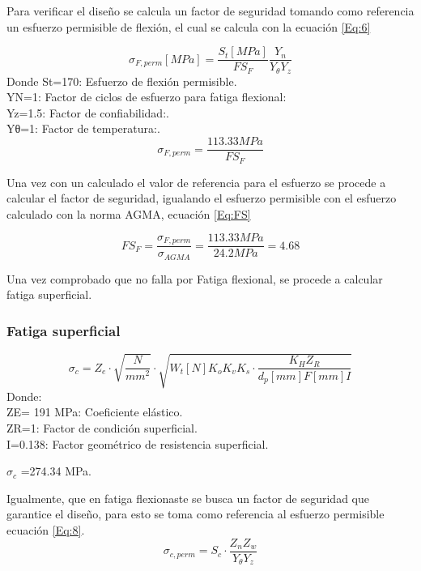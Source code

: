 Para verificar el diseño se calcula un factor de seguridad tomando como referencia un esfuerzo permisible de flexión, el cual se calcula con la ecuación \ref{Eq:6}

\begin{equation}
 \sigma_{F,perm}[MPa]=\frac{S_{t}[MPa]}{FS_{F}}  \frac{Y_{n}}{Y_{\theta}Y_{z}} 
\label{Eq:6}    
\end{equation}
Donde 
St=170: Esfuerzo de flexión permisible.\\
YN=1: Factor de ciclos de esfuerzo para fatiga flexional: \\
Yz=1.5: Factor de confiabilidad:.\\
Yθ=1: Factor de temperatura:.\\

\begin{equation}
 \sigma_{F,perm}=\frac{113.33  MPa}{FS_{F}}  
\label{Eq:sagama}    
\end{equation}

Una vez con un calculado el valor de referencia para el esfuerzo se procede a calcular el factor de seguridad, igualando el esfuerzo permisible con el esfuerzo calculado con la norma AGMA, ecuación \ref{Eq:FS}

\begin{equation}
 {FS_{F}}=\frac{\sigma_{F,perm}}{\sigma_{AGMA}} =\frac{113.33  MPa}{24.2 MPa} = 4.68 
\label{Eq:FS}    
\end{equation}



Una vez comprobado que no falla por Fatiga flexional, se procede a calcular fatiga superficial.
\subsubsection*{Fatiga superficial}
\begin{equation}
 \sigma_{c}=Z_{e}\cdot \sqrt{\frac{N}{mm^{2}}} \cdot \sqrt{W_{t}[N]K_{o}K_{v}K_{s} \cdot \frac{K_{H}Z_{R}}{d_{p}[mm]F[mm]I}}
\label{Eq:7}    
\end{equation}
Donde: \\
ZE= 191 MPa: Coeficiente elástico.\\
ZR=1: Factor de condición superficial.\\
I=0.138: Factor geométrico de resistencia superficial.

\begin{center}
$\sigma_{c}$ =274.34 MPa.
\end{center}


Igualmente, que en fatiga flexionaste se busca un factor de seguridad que garantice el diseño, para esto se toma como referencia al esfuerzo permisible ecuación \ref{Eq:8}.
\begin{equation}
    \sigma_{c,perm}=S_{c}\cdot \frac{Z_{n}Z_{w}}{Y_{\theta}Y_{z}}
    \label{Eq:8}
\end{equation}

